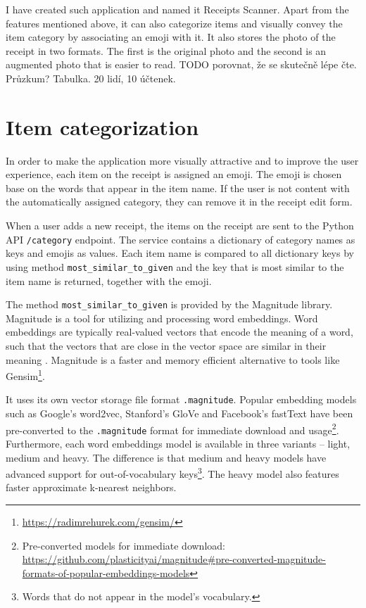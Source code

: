 \documentclass[
  digital, %
  table,   %
  oneside, %
  lof,     %
  lot,     %
]{fithesis3}
\begin{document}
I have created such application and named it Receipts Scanner. Apart from the features mentioned above, it can also categorize items and visually convey the item category by associating an emoji with it. It also stores the photo of the receipt in two formats. The first is the original photo and the second is an augmented photo that is easier to read. TODO porovnat, že se skutečně lépe čte. Průzkum? Tabulka. 20 lidí, 10 účtenek.

\chapter{Item categorization}
In order to make the application more visually attractive and to improve the user experience, each item on the receipt is assigned an emoji. The emoji is chosen base on the words that appear in the item name. If the user is not content with the automatically assigned category, they can remove it in the receipt edit form.

When a user adds a new receipt, the items on the receipt are sent to the Python API \texttt{/category} endpoint. The service contains a dictionary of category names as keys and emojis as values. Each item name is compared to all dictionary keys by using method \texttt{most\_similar\_to\_given} and the key that is most similar to the item name is returned, together with the emoji.

The method \texttt{most\_similar\_to\_given} is provided by the Magnitude library\cite{patel-etal-2018-magnitude}. Magnitude is a tool for utilizing and processing word embeddings. Word embeddings are typically real-valued vectors that encode the meaning of a word, such that the vectors that are close in the vector space are similar in their meaning \cite{Jurafsky2020}. Magnitude is a faster and memory efficient alternative to tools like Gensim\footnote{\url{https://radimrehurek.com/gensim/}}. 

It uses its own vector storage file format \texttt{.magnitude}.
Popular embedding models such as Google's word2vec, Stanford's GloVe and Facebook's fastText have been pre-converted to the \texttt{.magnitude} format for immediate download and usage\footnote{Pre-converted models for immediate download: \url{https://github.com/plasticityai/magnitude\#pre-converted-magnitude-formats-of-popular-embeddings-models}}. Furthermore, each word embeddings model is available in three variants -- light, medium and heavy. The difference is that medium and heavy models have advanced support for out-of-vocabulary keys\footnote{Words that do not appear in the model's vocabulary.}. The heavy model also features faster approximate k-nearest neighbors. 
\end{document}
